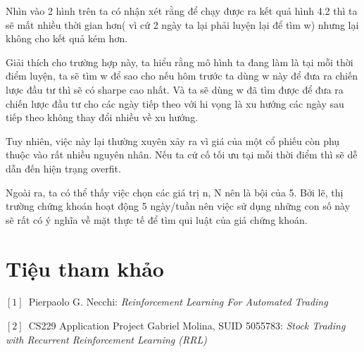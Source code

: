 \documentclass[14pt]{extreport}
\begin{document}
Nhìn vào 2 hình trên ta có nhận xét rằng để chạy được ra kết quả hình 4.2 thì ta sẽ mất nhiều thời gian hơn( vì cứ 2 ngày ta lại phải luyện lại để tìm w) nhưng lại không cho kết quả kém hơn.

Giải thích cho trường hợp này, ta hiểu rằng mô hình ta đang làm là tại mỗi thời điểm luyện, ta sẽ tìm w để sao cho nếu hôm trước ta dùng w này để đưa ra chiến lược đầu tư thì sẽ có sharpe cao nhất. Và ta sẽ dùng w đã tìm được để đưa ra chiến lược đầu tư cho các ngày tiếp theo với hi vọng là xu hướng các ngày sau tiếp theo không thay đổi nhiều về xu hướng. 

Tuy nhiên, việc này lại thường xuyên xảy ra vì giá của một cổ phiếu còn phụ thuộc vào rất nhiều nguyên nhân. Nếu ta cứ cố tối ưu tại mỗi thời điểm thì sẽ dễ dẫn đến hiện trạng overfit.

Ngoài ra, ta có thể thấy việc chọn các giá trị n, N nên là bội của 5. Bởi lẽ, thị trường chứng khoán hoạt động 5 ngày/tuần nên việc sử dụng những con số này sẽ rất có ý nghĩa về mặt thực tế để tìm qui luật của giá chứng khoán.


\newpage
{}
\chapter*{Tiệu tham khảo}
\begin{flushleft}

\quad $[1]$\ Pierpaolo G. Necchi: \textit{ Reinforcement Learning For Automated Trading}

\quad $[2]$\ CS229 Application Project
Gabriel Molina, SUID 5055783: \textit{ Stock Trading with Recurrent Reinforcement
Learning (RRL)}
\end{flushleft}
\end{document}
